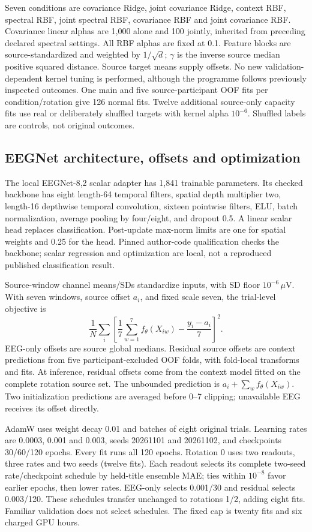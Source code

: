 \documentclass[11pt,a4paper]{article}
\begin{document}
Seven conditions are covariance Ridge, joint covariance Ridge, context RBF, spectral RBF, joint spectral RBF, covariance RBF and joint covariance RBF. Covariance linear alphas are 1,000 alone and 100 jointly, inherited from preceding declared spectral settings. All RBF alphas are fixed at 0.1. Feature blocks are source-standardized and weighted by \(1/\sqrt d\); \(\gamma\) is the inverse source median positive squared distance. Source target means supply offsets. No new validation-dependent kernel tuning is performed, although the programme follows previously inspected outcomes. One main and five source-participant OOF fits per condition/rotation give 126 normal fits. Twelve additional source-only capacity fits use real or deliberately shuffled targets with kernel alpha \(10^{-6}\). Shuffled labels are controls, not original outcomes.

\subsection{EEGNet architecture, offsets and optimization}
The local EEGNet-8,2 scalar adapter has 1,841 trainable parameters. Its checked backbone \cite{lawhern2018eegnet} has eight length-64 temporal filters, spatial depth multiplier two, length-16 depthwise temporal convolution, sixteen pointwise filters, ELU, batch normalization, average pooling by four/eight, and dropout 0.5. A linear scalar head replaces classification. Post-update max-norm limits are one for spatial weights and 0.25 for the head. Pinned author-code qualification checks the backbone; scalar regression and optimization are local, not a reproduced published classification result.

Source-window channel means/SDs standardize inputs, with SD floor \(10^{-6}\,\mu\mathrm{V}\). With seven windows, source offset \(a_i\), and fixed scale seven, the trial-level objective is
\[
\frac1N\sum_i\left[
\frac17\sum_{w=1}^7f_\theta(X_{iw})-\frac{y_i-a_i}{7}
\right]^2.
\]
EEG-only offsets are source global medians. Residual source offsets are context predictions from five participant-excluded OOF folds, with fold-local transforms and fits. At inference, residual offsets come from the context model fitted on the complete rotation source set. The unbounded prediction is \(a_i+\sum_w f_\theta(X_{iw})\). Two initialization predictions are averaged before 0--7 clipping; unavailable EEG receives its offset directly.

AdamW uses weight decay 0.01 and batches of eight original trials. Learning rates are 0.0003, 0.001 and 0.003, seeds 20261101 and 20261102, and checkpoints 30/60/120 epochs. Every fit runs all 120 epochs. Rotation 0 uses two readouts, three rates and two seeds (twelve fits). Each readout selects its complete two-seed rate/checkpoint schedule by held-title ensemble MAE; ties within \(10^{-8}\) favor earlier epochs, then lower rates. EEG-only selects 0.001/30 and residual selects 0.003/120. These schedules transfer unchanged to rotations 1/2, adding eight fits. Familiar validation does not select schedules. The fixed cap is twenty fits and six charged GPU hours.
\end{document}
